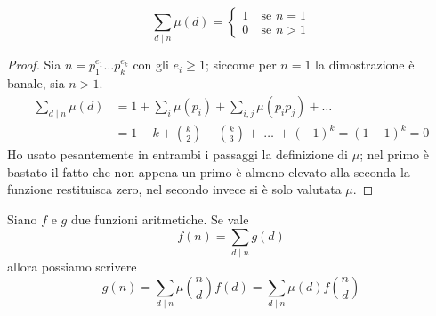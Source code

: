 \begin{proposizione}
	\label{somma_moebius}
	\begin{equation*}
	\sum_{d\mid n}\mu(d)=
	\begin{cases}
	1 \ & \text{se $n=1$}\\
	0 \ & \text{se $n>1$}
	\end{cases}
	\end{equation*}
\end{proposizione}
\begin{proof} 
	Sia $n=p_1^{e_1}\dots p_k^{e_k}$ con gli $e_i\geq 1$; siccome per $n=1$ la dimostrazione è banale, sia $n>1$.
	\begin{align*}
	\sum_{d\mid n}\mu(d)&=1+\sum_i\mu(p_i)+\sum_{i,j}\mu(p_ip_j)+\dots\\
	&= 1-k+\binom{k}{2}-\binom{k}{3}+\ \dots \ +(-1)^k=(1-1)^k=0
	\end{align*}
	Ho usato pesantemente in entrambi i passaggi la definizione di $\mu$; nel primo è bastato il fatto che non appena un primo è almeno elevato alla seconda la funzione restituisca zero, nel secondo invece si è solo valutata $\mu$.
\end{proof}
\begin{teorema}
	Siano $f$ e $g$ due funzioni aritmetiche. Se vale 
	\begin{equation*}
	f(n)=\sum_{d\mid n}g(d)
	\end{equation*}
	allora possiamo scrivere
	\begin{equation*}
	g(n)=\sum_{d\mid n}\mu\left(\frac{n}{d}\right)f(d)=\sum_{d\mid n}\mu(d)f\left(\frac{n}{d}\right)
	\end{equation*}
\end{teorema}
